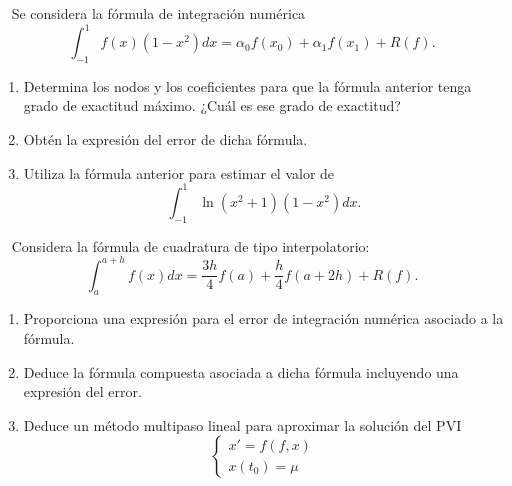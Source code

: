 \begin{ejercicio}~\label{ej:2.3.8}
    Se considera la fórmula de integración numérica
    \begin{equation*}
        \int_{-1}^{1} f(x)(1 - x^2)dx = \alpha_0 f(x_0) + \alpha_1 f(x_1) + R(f).
    \end{equation*}
    \begin{enumerate}
        \item Determina los nodos y los coeficientes para que la fórmula anterior tenga grado de exactitud máximo. ¿Cuál es ese grado de exactitud?
        \item Obtén la expresión del error de dicha fórmula.
        \item Utiliza la fórmula anterior para estimar el valor de
        \begin{equation*}
            \int_{-1}^{1} \ln(x^2 + 1)(1 - x^2)dx .
        \end{equation*}
    \end{enumerate}
\end{ejercicio}

\begin{ejercicio}~\label{ej:2.3.9}
    Considera la fórmula de cuadratura de tipo interpolatorio:
    \begin{equation*}
        \int_{a}^{a+h} f(x)dx = \frac{3h}{4}f(a) + \frac{h}{4}f(a + 2h) + R(f).
    \end{equation*}
    \begin{enumerate}
        \item Proporciona una expresión para el error de integración numérica asociado a la fórmula.
        \item Deduce la fórmula compuesta asociada a dicha fórmula incluyendo una expresión del error.
        \item Deduce un método multipaso lineal para aproximar la solución del PVI
        \begin{equation*}
            \begin{cases}
                x' = f(f, x) \\
                x(t_0) = \mu
            \end{cases}
        \end{equation*}
    \end{enumerate}
\end{ejercicio}

